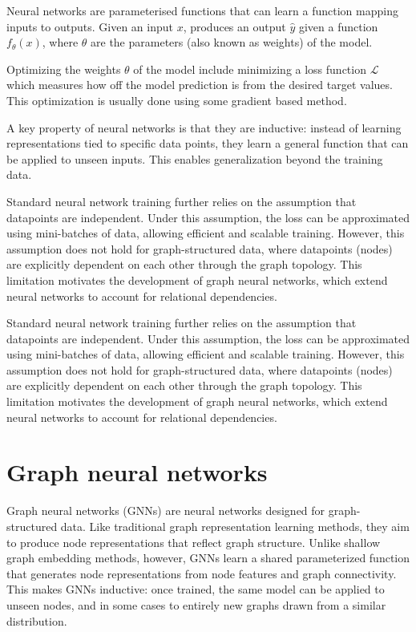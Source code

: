 \documentclass[ oneside,openright,titlepage,numbers=noenddot,headinclude,%
                footinclude=true,cleardoublepage=empty,abstractoff, %
                BCOR=0mm,paper=a4,fontsize=11pt,%
                ngerman,american,%
                ]{scrreprt}
\begin{document}
Neural networks are parameterised functions that can learn a function mapping inputs to outputs. Given an input $x$, produces an output $\hat{y}$ given a function $f_{\theta}(x)$, where $\theta$ are the parameters (also known as weights) of the model.

Optimizing the weights $\theta$ of the model include minimizing a loss function $\mathcal{L}$ which measures how off the model prediction is from the desired target values. This optimization is usually done using some gradient based method.

A key property of neural networks is that they are inductive: instead of learning representations tied to specific data points, they learn a general function that can be applied to unseen inputs. This enables generalization beyond the training data.

Standard neural network training further relies on the assumption that datapoints are independent. Under this assumption, the loss can be approximated using mini-batches of data, allowing efficient and scalable training.
However, this assumption does not hold for graph-structured data, where datapoints (nodes) are explicitly dependent on each other through the graph topology. This limitation motivates the development of graph neural networks, which extend neural networks to account for relational dependencies.


Standard neural network training further relies on the assumption that datapoints are independent. Under this assumption, the loss can be approximated using mini-batches of data, allowing efficient and scalable training.
However, this assumption does not hold for graph-structured data, where datapoints (nodes) are explicitly dependent on each other through the graph topology. This limitation motivates the development of graph neural networks, which extend neural networks to account for relational dependencies.


\section{Graph neural networks}

Graph neural networks (GNNs) are neural networks designed for graph-structured data. 
Like traditional graph representation learning methods, they aim to produce node representations that reflect graph structure. 
Unlike shallow graph embedding methods, however, GNNs learn a shared parameterized function that generates node representations from node features and graph connectivity. 
This makes GNNs inductive: once trained, the same model can be applied to unseen nodes, and in some cases to entirely new graphs drawn from a similar distribution.
\end{document}
